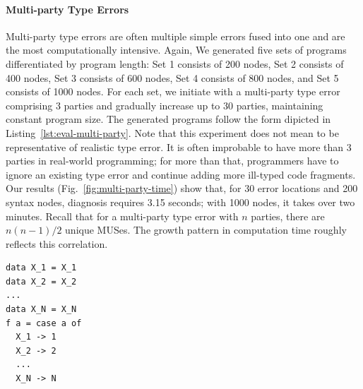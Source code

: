\documentclass[pdflatex,lineno,sn-nature,Numbered]{sn-jnl}%
\begin{document}
\paragraph{Multi-party Type Errors}

Multi-party type errors are often multiple simple errors fused into one and are the most computationally intensive. Again, We generated five sets of programs differentiated by program length: Set 1 consists of 200 nodes, Set 2 consists of 400 nodes, Set 3 consists of 600 nodes, Set 4 consists of 800 nodes, and Set 5 consists of 1000 nodes. For each set, we initiate with a multi-party type error comprising 3 parties and gradually increase up to 30 parties, maintaining constant program size. The generated programs  follow the form dipicted in Listing~\ref{lst:eval-multi-party}. Note that this experiment does not mean to be representative of realistic type error. It is often improbable to have more than 3 parties in real-world programming; for more than that, programmers have to ignore an existing type error and continue adding more ill-typed code fragments. Our results (Fig.~\ref{fig:multi-party-time}) show that, for 30 error locations and 200 syntax nodes, diagnosis requires 3.15 seconds; with 1000 nodes, it takes over two minutes. Recall that for a multi-party type error with $n$ parties, there are $n (n - 1) / 2$ unique MUSes. The growth pattern in computation time roughly reflects this correlation.

\begin{lstlisting}[caption={{\bf Multi-party error generation example}. To study the effect of multi-party type errors on performance, we generated programs with different number of $N$, ranging from 3 to 30.}, label={lst:eval-multi-party}]
data X_1 = X_1
data X_2 = X_2
...
data X_N = X_N
f a = case a of
  X_1 -> 1
  X_2 -> 2
  ...
  X_N -> N
\end{lstlisting}
\end{document}
